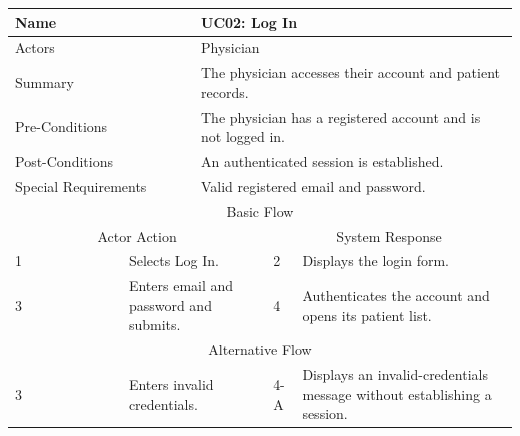 \begin{reporttable}
\centering
\small
\caption{UC02: Log In.}
\label{tab:kashaf:uc02}
\begin{tabular}{|p{}|p{}|p{}|p{}|p{}|}
\hline
\multicolumn{2}{|p{\dimexpr0.225\textwidth+2\tabcolsep+\arrayrulewidth\relax}|}{Name} & \multicolumn{3}{p{\dimexpr0.575\textwidth+4\tabcolsep+2\arrayrulewidth\relax}|}{UC02: Log In} \\ \hline
\multicolumn{2}{|p{\dimexpr0.225\textwidth+2\tabcolsep+\arrayrulewidth\relax}|}{Actors} & \multicolumn{3}{p{\dimexpr0.575\textwidth+4\tabcolsep+2\arrayrulewidth\relax}|}{Physician} \\ \hline
\multicolumn{2}{|p{\dimexpr0.225\textwidth+2\tabcolsep+\arrayrulewidth\relax}|}{Summary} & \multicolumn{3}{p{\dimexpr0.575\textwidth+4\tabcolsep+2\arrayrulewidth\relax}|}{The physician accesses their account and patient records.} \\ \hline
\multicolumn{2}{|p{\dimexpr0.225\textwidth+2\tabcolsep+\arrayrulewidth\relax}|}{Pre-Conditions} & \multicolumn{3}{p{\dimexpr0.575\textwidth+4\tabcolsep+2\arrayrulewidth\relax}|}{The physician has a registered account and is not logged in.} \\ \hline
\multicolumn{2}{|p{\dimexpr0.225\textwidth+2\tabcolsep+\arrayrulewidth\relax}|}{Post-Conditions} & \multicolumn{3}{p{\dimexpr0.575\textwidth+4\tabcolsep+2\arrayrulewidth\relax}|}{An authenticated session is established.} \\ \hline
\multicolumn{2}{|p{\dimexpr0.225\textwidth+2\tabcolsep+\arrayrulewidth\relax}|}{Special Requirements} & \multicolumn{3}{p{\dimexpr0.575\textwidth+4\tabcolsep+2\arrayrulewidth\relax}|}{Valid registered email and password.} \\ \hline
\multicolumn{5}{|c|}{Basic Flow} \\ \hline
\multicolumn{3}{|c|}{Actor Action} & \multicolumn{2}{c|}{System Response} \\ \hline
1 & \multicolumn{2}{p{\dimexpr0.37\textwidth+2\tabcolsep+\arrayrulewidth\relax}|}{Selects Log In.} & 2 & Displays the login form. \\ \hline
3 & \multicolumn{2}{p{\dimexpr0.37\textwidth+2\tabcolsep+\arrayrulewidth\relax}|}{Enters email and password and submits.} & 4 & Authenticates the account and opens its patient list. \\ \hline
\multicolumn{5}{|c|}{Alternative Flow} \\ \hline
3 & \multicolumn{2}{p{\dimexpr0.37\textwidth+2\tabcolsep+\arrayrulewidth\relax}|}{Enters invalid credentials.} & 4-A & Displays an invalid-credentials message without establishing a session. \\ \hline
\end{tabular}
\end{reporttable}

